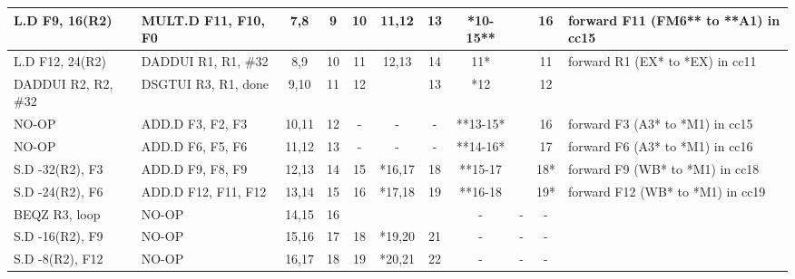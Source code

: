 \begin{table}[b]
{\begin{tabular}{|l|l|c|c|c|c|c|c|c|c|l|}
	L.D            F9, 16(R2)      & MULT.D     F11, F10, F0   & 7,8   & 9  & 10        & 11,12  & 13 & *10-15** &   & 16  & forward F11 (FM6** to   **A1) in cc15 \\ \hline
	L.D            F12, 24(R2)     & DADDUI     R1, R1, \#32   & 8,9   & 10 & 11        & 12,13  & 14 & 11*      &   & 11  & forward R1 (EX* to   *EX) in cc11     \\ \hline
	DADDUI     R2, R2, \#32        & DSGTUI     R3, R1, done   & 9,10  & 11 & 12        &        & 13 & *12      &   & 12  &                                       \\ \hline
	NO-OP                          & ADD.D       F3, F2, F3    & 10,11 & 12 & -         & -      & -  & **13-15* &   & 16  & forward F3 (A3* to   *M1) in cc15     \\ \hline
	NO-OP                          & ADD.D       F6, F5, F6    & 11,12 & 13 & -         & -      & -  & **14-16* &   & 17  & forward F6 (A3* to   *M1) in cc16     \\ \hline
	S.D            -32(R2), F3     & ADD.D       F9, F8, F9    & 12,13 & 14 & 15        & *16,17 & 18 & **15-17  &   & 18* & forward F9 (WB* to   *M1) in cc18     \\ \hline
	S.D            -24(R2), F6     & ADD.D       F12, F11, F12 & 13,14 & 15 & 16        & *17,18 & 19 & **16-18  &   & 19* & forward F12 (WB* to   *M1) in cc19    \\ \hline
	BEQZ         R3, loop          & NO-OP                     & 14,15 & 16 & \textbf{} &        &    & -        & - & -   &                                       \\ \hline
	S.D            -16(R2), F9     & NO-OP                     & 15,16 & 17 & 18        & *19,20 & 21 & -        & - & -   &                                       \\ \hline
	S.D            -8(R2), F12     & NO-OP                     & 16,17 & 18 & 19        & *20,21 & 22 & -        & - & -   &                                       \\ \hline
\end{tabular}
}
\end{table}